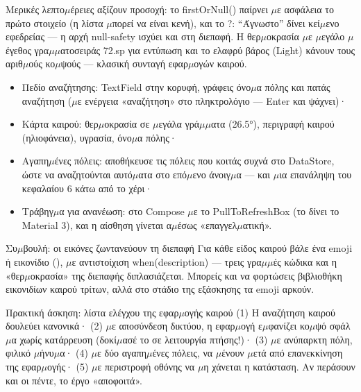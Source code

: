 Μερικές λεπτο$\mu$έρειες αξίζουν προσοχή: το firstOrNull() παίρνει $\mu$ε ασφάλεια το πρώτο στοιχείο (η λίστα $\mu$πορεί να είναι κενή), και το ?: “Άγνωστο” δίνει κεί$\mu$ενο εφεδρείας — η αρχή null-safety ισχύει και στη διεπαφή. Η θερ$\mu$οκρασία $\mu$ε $\mu$εγάλο $\mu$έγεθος γρα$\mu$$\mu$ατοσειράς 72.sp για εντύπωση και το ελαφρύ βάρος (Light) κάνουν τους αριθ$\mu$ούς κο$\mu$ψούς — κλασική συνταγή εφαρ$\mu$ογών καιρού.



\begin{itemize}
  \item Πεδίο αναζήτησης: TextField στην κορυφή, γράφεις όνο$\mu$α πόλης και πατάς αναζήτηση ($\mu$ε ενέργεια «αναζήτηση» στο πληκτρολόγιο — Enter και ψάχνει)·
  \item Κάρτα καιρού: θερ$\mu$οκρασία σε $\mu$εγάλα γρά$\mu$$\mu$ατα (26.5°), περιγραφή καιρού (ηλιοφάνεια), υγρασία, όνο$\mu$α πόλης·
  \item Αγαπη$\mu$ένες πόλεις: αποθήκευσε τις πόλεις που κοιτάς συχνά στο DataStore, ώστε να αναζητούνται αυτό$\mu$ατα στο επό$\mu$ενο άνοιγ$\mu$α — και $\mu$ια επανάληψη του κεφαλαίου 6 κάτω από το χέρι·
  \item Τράβηγ$\mu$α για ανανέωση: στο Compose $\mu$ε το PullToRefreshBox (το δίνει το Material 3), και η αίσθηση γίνεται α$\mu$έσως «επαγγελ$\mu$ατική».
\end{itemize}

\begin{tcbinfo}{Συ$\mu$βουλή: οι εικόνες ζωντανεύουν τη διεπαφή}
Για κάθε είδος καιρού βάλε ένα emoji ή εικονίδιο (), $\mu$ε αντιστοίχιση when(description) — τρεις γρα$\mu$$\mu$ές κώδικα και η «θερ$\mu$οκρασία» της διεπαφής διπλασιάζεται. Μπορείς και να φορτώσεις βιβλιοθήκη εικονιδίων καιρού τρίτων, αλλά στο στάδιο της εξάσκησης τα emoji αρκούν.

\end{tcbinfo}

\begin{tcbpractice}{Πρακτική άσκηση: λίστα ελέγχου της εφαρ$\mu$ογής καιρού}
(1) Η αναζήτηση καιρού δουλεύει κανονικά· (2) $\mu$ε αποσύνδεση δικτύου, η εφαρ$\mu$ογή ε$\mu$φανίζει κο$\mu$ψό σφάλ$\mu$α χωρίς κατάρρευση (δοκί$\mu$ασέ το σε λειτουργία πτήσης!)· (3) $\mu$ε ανύπαρκτη πόλη, φιλικό $\mu$ήνυ$\mu$α· (4) $\mu$ε δύο αγαπη$\mu$ένες πόλεις, να $\mu$ένουν $\mu$ετά από επανεκκίνηση της εφαρ$\mu$ογής· (5) $\mu$ε περιστροφή οθόνης να $\mu$η χάνεται η κατάσταση. Αν περάσουν και οι πέντε, το έργο «αποφοιτά».

\end{tcbpractice}

